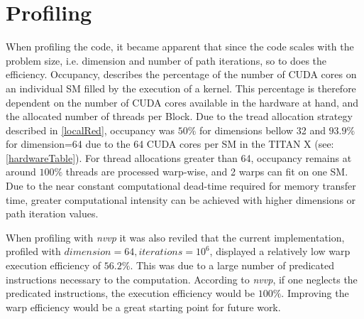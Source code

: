 \section{Profiling}
When profiling the code, it became apparent that since the code scales with the problem
size, i.e. dimension and number of path iterations, so to does the efficiency.  Occupancy,
describes the percentage of the number of CUDA cores on an individual SM filled
by the execution of a kernel.  This
percentage is therefore dependent on the number of CUDA cores available in the hardware at hand,
and the allocated number of threads per Block.
Due to the tread allocation strategy described in \ref{localRed}, occupancy was $50\%$
for dimensions bellow 32 and $93.9\%$ for dimension=64 due to the 64 CUDA cores
per SM in the TITAN X (see: \ref{hardwareTable}). For thread allocations greater than
64, occupancy remains at around $100\%$ threads are processed warp-wise, and 2 warps can
fit on one SM. Due to the near constant computational dead-time required for memory transfer time,
greater computational intensity can be achieved with higher dimensions or path iteration values.
\par
When profiling with \textit{nvvp} it was also reviled that the current implementation,
profiled with $dimension=64, iterations=10^{6}$, displayed a relatively low warp
execution efficiency of $56.2\%$.  This was due to a large number of predicated
instructions necessary to the computation.  According to \textit{nvvp}, if one
neglects the predicated instructions, the execution efficiency would be $100\%$.
Improving the warp efficiency would be a great starting point for future work.

